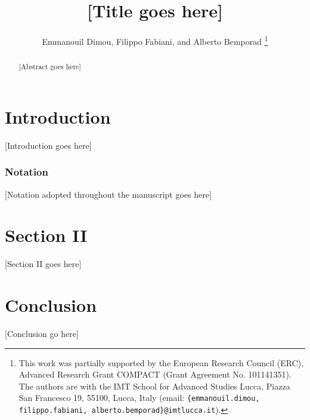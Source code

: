 \documentclass[letterpaper, 10 pt, conference]{ieeeconf}  %
\title{\LARGE \bf
[Title goes here]
}
\author{Emmanouil Dimou, Filippo Fabiani, and Alberto Bemporad%
\thanks{This work was partially supported by the European Research Council (ERC), Advanced Research Grant COMPACT (Grant Agreement No. 101141351).
The authors are with the IMT School for Advanced Studies Lucca, Piazza San Francesco 19, 55100, Lucca, Italy (email: {\tt \footnotesize \{emmanouil.dimou, filippo.fabiani, alberto.bemporad\}@imtlucca.it}).}%
}
\begin{document}
\maketitle
\thispagestyle{empty}
\pagestyle{empty}

\begin{abstract}
[Abstract goes here]
\end{abstract}


\section{Introduction}
[Introduction goes here]

\subsubsection*{Notation}
[Notation adopted throughout the manuscript goes here]

\section{Section II}
[Section II goes here]

\section{Conclusion}
[Conclusion go here]




\end{document}

